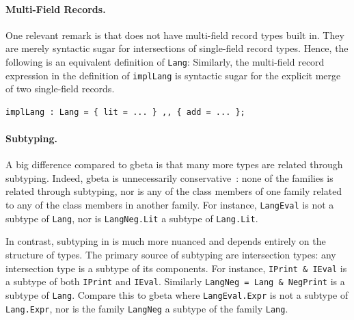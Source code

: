 \paragraph{Multi-Field Records.} One relevant remark is that
\namee does not have multi-field record types built in. They are merely syntactic
sugar for intersections of single-field record types. Hence, the following is an
equivalent definition of \lstinline{Lang}:
Similarly, the multi-field record expression in the definition of
\lstinline{implLang} is syntactic sugar for the explicit merge of two
single-field records.
\begin{lstlisting}
implLang : Lang = { lit = ... } ,, { add = ... };
\end{lstlisting}

\paragraph{Subtyping.}
A big difference compared to gbeta is that many more \namee types are related through
subtyping. Indeed, gbeta is unnecessarily conservative~\citep{ernst_hoh}: none of the families is related
through subtyping, nor is any of the class members of one family related to any
of the class members in another family. For instance, \lstinline{LangEval} is
not a subtype of \lstinline{Lang}, nor is \lstinline{LangNeg.Lit} a subtype
of \lstinline{Lang.Lit}.

In contrast, subtyping in \namee is much more nuanced and depends entirely on the
structure of types. The primary source of subtyping are intersection types:
any intersection type is a subtype of its components. For instance, 
\lstinline{IPrint & IEval} is a subtype of both \lstinline{IPrint} and
\lstinline{IEval}. Similarly \lstinline{LangNeg = Lang & NegPrint} is a subtype
of \lstinline{Lang}. Compare this to gbeta where \lstinline{LangEval.Expr} is
not a subtype of \lstinline{Lang.Expr}, nor is the family \lstinline{LangNeg} a
subtype of the family \lstinline{Lang}.

